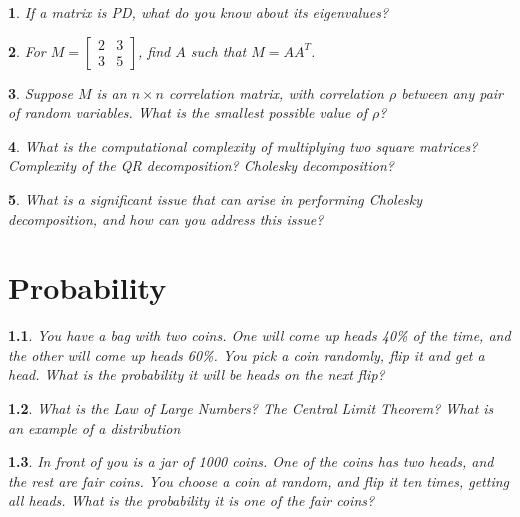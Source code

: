 \documentclass{report}
\newtheorem{problem}{}
\numberwithin{problem}{chapter} %
\begin{document}
\begin{problem}
If a matrix is PD, what do you know about its eigenvalues?
\end{problem}

\begin{problem}
For $M =\begin{bmatrix}
    2  & 3 \\
    3  & 5
\end{bmatrix}$, find $A$ such that $M=AA^{T}$.
\end{problem}

\begin{problem}
Suppose $M$ is an $n\times n$ correlation matrix, with correlation $\rho$ between any pair of random variables. What is the smallest possible value of $\rho$?
\end{problem}

\begin{problem}
What is the computational complexity of multiplying two square matrices? Complexity of the QR decomposition? Cholesky decomposition?
\end{problem}

\begin{problem}
What is a significant issue that can arise in performing Cholesky decomposition, and how can you address this issue?
\end{problem}

\chapter{Probability}

\begin{problem}
You have a bag with two coins. One will come up heads 40\% of the time, and the other will come up heads 60\%. You pick a coin randomly, flip it and get a head. What is the probability it will be heads on the next flip?
\end{problem}

\begin{problem}
What is the Law of Large Numbers? The Central Limit Theorem? What is an example of a distribution 
\end{problem}

\begin{problem}
In front of you is a jar of 1000 coins. One of the coins has two heads, and the rest are fair coins. You choose a coin at random, and flip it ten times, getting all heads. What is the probability it is one of the fair coins?
\end{problem}
\end{document}
